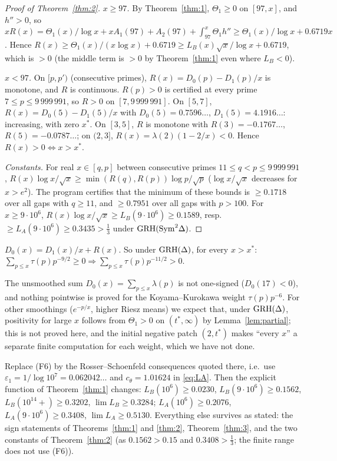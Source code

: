 \begin{proof}[Proof of Theorem~\ref{thm:2}]
\emph{$x\ge97$.} By Theorem~\ref{thm:1}, $\Theta_1\ge0$ on $[97,x]$, and $h''>0$, so $xR(x)=\Theta_1(x)/\log x+xA_1(97)+A_2(97)+\int_{97}^x\Theta_1h''\ge\Theta_1(x)/\log x+0.6719x$. Hence $R(x)\ge\Theta_1(x)/(x\log x)+0.6719\ge L_B(x)\sqrt x/\log x+0.6719$, which is $>0$ (the middle term is $>0$ by Theorem~\ref{thm:1} even where $L_B<0$).

\emph{$x<97$.} On $[p,p')$ (consecutive primes), $R(x)=D_0(p)-D_1(p)/x$ is monotone, and $R$ is continuous. $R(p)>0$ is certified at every prime $7\le p\le9\,999\,991$, so $R>0$ on $[7,9\,999\,991]$. On $[5,7]$, $R(x)=D_0(5)-D_1(5)/x$ with $D_0(5)=0.7596\ldots$, $D_1(5)=4.1916\ldots$: increasing, with zero $x^*$. On $[3,5]$, $R$ is monotone with $R(3)=-0.1767\ldots$, $R(5)=-0.0787\ldots$; on $(2,3]$, $R(x)=\lambda(2)(1-2/x)<0$. Hence $R(x)>0\iff x>x^*$.

\emph{Constants.} For real $x\in[q,p]$ between consecutive primes $11\le q<p\le9\,999\,991$, $R(x)\log x/\sqrt x\ge\min(R(q),R(p))\log p/\sqrt p$ ($\log x/\sqrt x$ decreases for $x>e^2$). The program certifies that the minimum of these bounds is $\ge0.1718$ over all gaps with $q\ge11$, and $\ge0.7951$ over all gaps with $p>100$. For $x\ge9\cdot10^6$, $R(x)\log x/\sqrt x\ge L_B(9\cdot10^6)\ge0.1589$, resp.\ $\ge L_A(9\cdot10^6)\ge0.3435>\frac13$ under $\mathrm{GRH}(\mathrm{Sym}^2\Delta)$.
\end{proof}

\begin{remark}
$D_0(x)=D_1(x)/x+R(x)$. So under $\mathrm{GRH}(\Delta)$, for every $x>x^*$: $\sum_{p\le x}\tau(p)p^{-9/2}\ge0\Rightarrow\sum_{p\le x}\tau(p)p^{-11/2}>0$.
\end{remark}

\begin{remark}
The unsmoothed sum $D_0(x)=\sum_{p\le x}\lambda(p)$ is not one-signed ($D_0(17)<0$), and nothing pointwise is proved for the Koyama--Kurokawa weight $\tau(p)p^{-6}$. For other smoothings ($e^{-p/x}$, higher Riesz means) we expect that, under $\mathrm{GRH}(\Delta)$, positivity for large $x$ follows from $\Theta_1>0$ on $(t^*,\infty)$ by Lemma~\ref{lem:partial}; this is not proved here, and the initial negative patch $(2,t^*)$ makes ``every $x$'' a separate finite computation for each weight, which we have not done.
\end{remark}

\begin{remark}[robustness of (F6)]\label{rem:robust}
Replace (F6) by the Rosser--Schoenfeld consequences quoted there, i.e.\ use $\varepsilon_1=1/\log10^7=0.062042\ldots$ and $c_\theta=1.01624$ in \eqref{eq:LA}. Then the explicit function of Theorem~\ref{thm:1} changes: $L_B(10^6)\ge0.0230$, $L_B(9\cdot10^6)\ge0.1562$, $L_B(10^{14}+)\ge0.3202$, $\lim L_B\ge0.3284$; $L_A(10^6)\ge0.2076$, $L_A(9\cdot10^6)\ge0.3408$, $\lim L_A\ge0.5130$. Everything else survives as stated: the sign statements of Theorems~\ref{thm:1} and \ref{thm:2}, Theorem~\ref{thm:3}, and the two constants of Theorem~\ref{thm:2} (as $0.1562>0.15$ and $0.3408>\frac13$; the finite range does not use (F6)).
\end{remark}

